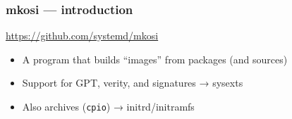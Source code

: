 \documentclass[]{beamer}
\newcommand\pp\pause
\begin{document}




\begin{frame}[fragile]
  \frametitle{mkosi — introduction}

  \url{https://github.com/systemd/mkosi}

  \pp

  \begin{itemize}
  \item A program that builds ``images'' from packages (and sources)
     \pp
   \item Support for GPT, verity, and signatures → sysexts
     \pp
   \item Also archives (\texttt{cpio}) → initrd/initramfs
  \end{itemize}
\end{frame}
\end{document}
